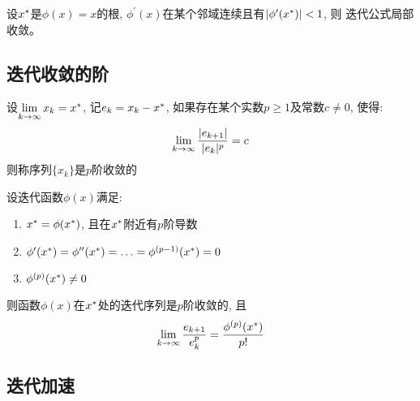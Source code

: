 \medskip

\begin{theorem_of_local_convergence}
    \label{theorem:theorem_of_local_convergence}
    设$x^\ast$是$\phi(x)=x$的根, $\phi^\prime(x)$在某个邻域连续且有$|\phi^\prime(x^\ast)|<1$, 则%
    迭代公式局部收敛。
\end{theorem_of_local_convergence}

\subsection{迭代收敛的阶}

\begin{iterative_convergence_order}
    \label{definition:iterative_convergence_order}
    设$\lim\limits_{k\to \infty} x_k = x^\ast$, 记$e_k = x_k - x^\ast$, 如果存在某个实数$p\ge 1$及常数$c\ne0$, 使得:
    \begin{equation}
        \lim\limits_{k\to\infty}{|e_{k+1}|\over{|e_k|^p}} = c
    \end{equation}
    则称序列$\{x_k\}$是$p$阶收敛的
\end{iterative_convergence_order}

\medskip

\begin{theorem_of_iterative_convergence_order}
    \label{theorem:theorem_of_iterative_convergence_order}
    设迭代函数$\phi(x)$满足:
    \begin{enumerate}
        \item $x^\ast = \phi(x^\ast)$, 且在$x^\ast$附近有$p$阶导数
        \item $\phi^\prime(x^\ast)=\phi^{\prime\prime}(x^\ast)=\ldots=\phi^{(p-1)}(x^\ast)=0$
        \item $\phi^{(p)}(x^\ast)\ne 0$
    \end{enumerate}
    则函数$\phi(x)$在$x^\ast$处的迭代序列是$p$阶收敛的, 且
    \begin{equation}
        \lim\limits_{k\to\infty}{e_{k+1}\over {e_k^p}} = {\phi^{(p)}(x^\ast)\over p!}
    \end{equation}
\end{theorem_of_iterative_convergence_order}

\subsection{迭代加速}

